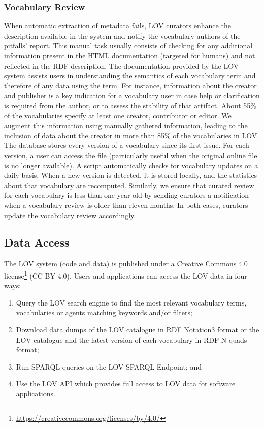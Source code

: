 \documentclass{iosart2c}
\begin{document}
	\subsubsection{Vocabulary Review}
When automatic extraction of metadata fails, LOV curators enhance the description available in the system and notify the vocabulary authors of the pitfalls' report. This manual task usually consists of checking for any additional information present in the HTML documentation (targeted for humans) and not reflected in the RDF description. The documentation provided by the LOV system assists users in understanding the semantics of each vocabulary term and therefore of any data using the term. For instance, information about the creator and publisher is a key indication for a vocabulary user in case help or clarification is required from the author, or to assess the stability of that artifact. About 55\% of the vocabularies specify at least one creator, contributor or editor. We augment this information using manually gathered information, leading to the inclusion of data about the creator in more than 85\% of the vocabularies in LOV. The database stores every version of a vocabulary since its first issue. For each version, a user can access the file (particularly useful when the original online file is no longer available). A script automatically checks for vocabulary updates on a daily basis. When a new version is detected, it is stored locally, and the statistics about that vocabulary are recomputed. Similarly, we ensure that curated review for each vocabulary is less than one year old by sending curators a notification when a vocabulary review is older than eleven months. In both cases, curators update the vocabulary review accordingly. 



\subsection{Data Access}

The LOV system (code and data) is published under a Creative Commons 4.0 license\footnote{\url{https://creativecommons.org/licenses/by/4.0/}} (CC BY 4.0). Users and applications can access the LOV data in four ways:
		\begin{enumerate} 
			\item Query the LOV search engine to find the most relevant vocabulary terms, vocabularies or agents matching keywords and/or filters;
			\item Download data dumps of the LOV catalogue in RDF Notation3 format or the LOV catalogue and the latest version of each vocabulary in RDF N-quads format;
			\item Run SPARQL queries on the LOV SPARQL Endpoint; and
			\item Use the LOV API which provides  full access to LOV data for software applications.
		\end{enumerate}
		
\end{document}
